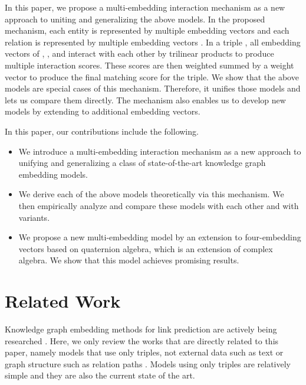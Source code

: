 \documentclass[sigconf,edbt]{acmart-edbt2019}
\begin{document}
In this paper, we propose a multi-embedding interaction mechanism as a new approach to uniting and generalizing the above models. In the proposed mechanism, each entity  is represented by multiple embedding vectors  and each relation  is represented by multiple embedding vectors . In a triple , all embedding vectors of , , and  interact with each other by trilinear products to produce multiple interaction scores. These scores are then weighted summed by a weight vector  to produce the final matching score for the triple. We show that the above models are special cases of this mechanism. Therefore, it unifies those models and lets us compare them directly. The mechanism also enables us to develop new models by extending to additional embedding vectors.

In this paper, our contributions include the following.
\begin{itemize}
	\item We introduce a multi-embedding interaction mechanism as a new approach to unifying and generalizing a class of state-of-the-art knowledge graph embedding models.
	\item We derive each of the above models theoretically via this mechanism. We then empirically analyze and compare these models with each other and with variants.
	\item We propose a new multi-embedding model by an extension to four-embedding vectors based on quaternion algebra, which is an extension of complex algebra. We show that this model achieves promising results.
\end{itemize}

\section{Related Work} \label{sect:relatedwork}
Knowledge graph embedding methods for link prediction are actively being researched \cite{wang_knowledgegraphembedding_2017}. Here, we only review the works that are directly related to this paper, namely models that use only triples, not external data such as text \cite{wang_knowledgegraphtext_2014} or graph structure such as relation paths \cite{lin_modelingrelationpaths_2015}. Models using only triples are relatively simple and they are also the current state of the art.
\end{document}
